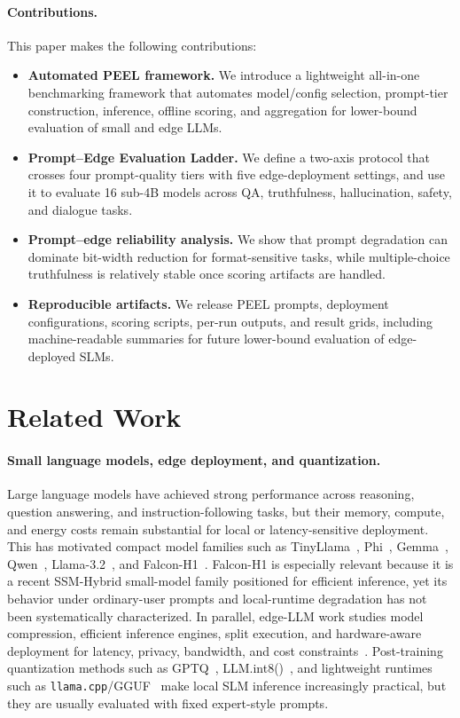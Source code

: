 \documentclass[letterpaper]{article} %
\begin{document}
\paragraph{Contributions.}
This paper makes the following contributions:
\begin{itemize}
\item \textbf{Automated PEEL framework.} We introduce a lightweight all-in-one benchmarking framework that automates model/config selection, prompt-tier construction, inference, offline scoring, and aggregation for lower-bound evaluation of small and edge LLMs.

\item \textbf{Prompt--Edge Evaluation Ladder.} We define a two-axis protocol that crosses four prompt-quality tiers with five edge-deployment settings, and use it to evaluate 16 sub-4B models across QA, truthfulness, hallucination, safety, and dialogue tasks.

\item \textbf{Prompt--edge reliability analysis.} We show that prompt degradation can dominate bit-width reduction for format-sensitive tasks, while multiple-choice truthfulness is relatively stable once scoring artifacts are handled.

\item \textbf{Reproducible artifacts.} We release PEEL prompts, deployment configurations, scoring scripts, per-run outputs, and result grids, including machine-readable summaries for future lower-bound evaluation of edge-deployed SLMs.
\end{itemize}


\section{Related Work}
\label{sec:related}

\paragraph{Small language models, edge deployment, and quantization.}
Large language models have achieved strong performance across reasoning, question answering, and instruction-following tasks, but their memory, compute, and energy costs remain substantial for local or latency-sensitive deployment. This has motivated compact model families such as TinyLlama~\cite{TinyLlama}, Phi~\cite{phi4}, Gemma~\cite{gemma2}, Qwen~\cite{qwen2025}, Llama-3.2~\cite{llama3}, and Falcon-H1~\cite{falconh1}. Falcon-H1 is especially relevant because it is a recent SSM-Hybrid small-model family positioned for efficient inference, yet its behavior under ordinary-user prompts and local-runtime degradation has not been systematically characterized. In parallel, edge-LLM work studies model compression, efficient inference engines, split execution, and hardware-aware deployment for latency, privacy, bandwidth, and cost constraints~\cite{llm_edge,Mobileaibench,li2025palmbench}. Post-training quantization methods such as GPTQ~\cite{gptq2022}, LLM.int8()~\cite{llmint8}, and lightweight runtimes such as \texttt{llama.cpp}/GGUF~\cite{gguf} make local SLM inference increasingly practical, but they are usually evaluated with fixed expert-style prompts.
\end{document}
